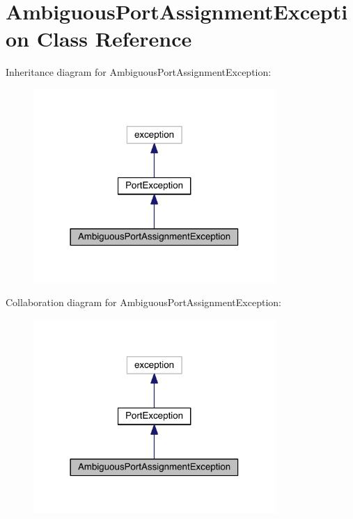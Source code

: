 \hypertarget{class_ambiguous_port_assignment_exception}{}\section{Ambiguous\+Port\+Assignment\+Exception Class Reference}
\label{class_ambiguous_port_assignment_exception}


Inheritance diagram for Ambiguous\+Port\+Assignment\+Exception\+:
\nopagebreak
\begin{figure}[H]
\begin{center}
\leavevmode
\includegraphics[width=261pt]{class_ambiguous_port_assignment_exception__inherit__graph}
\end{center}
\end{figure}


Collaboration diagram for Ambiguous\+Port\+Assignment\+Exception\+:
\nopagebreak
\begin{figure}[H]
\begin{center}
\leavevmode
\includegraphics[width=261pt]{class_ambiguous_port_assignment_exception__coll__graph}
\end{center}
\end{figure}
